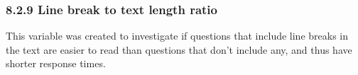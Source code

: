 \documentclass{article}
\begin{document}

\subsubsection*{8.2.9 Line break to text length ratio}

This variable was created to investigate if questions that include line breaks in the text are easier to read than questions that don't include any, and thus have shorter response times. 






\end{document}
